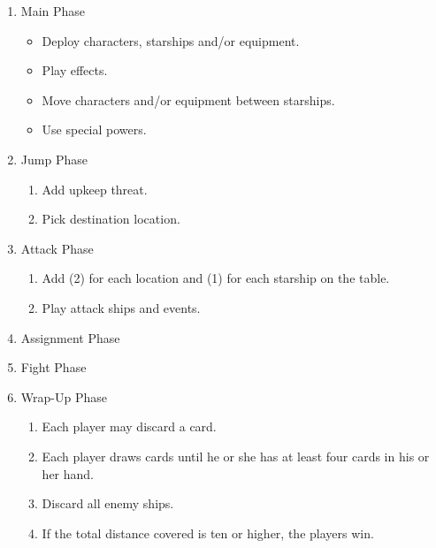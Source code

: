 \documentclass[11pt, a4paper]{article}
\begin{document}
\begin{enumerate}
 \item Main Phase

 \begin{itemize}
  \item Deploy characters, starships and/or equipment.
  \item Play effects.
  \item Move characters and/or equipment between starships.
  \item Use special powers.
 \end{itemize}

 \item Jump Phase

 \begin{enumerate}
  \item Add upkeep threat.
  \item Pick destination location.
 \end{enumerate}

 \item Attack Phase

 \begin{enumerate}
  \item Add (2) for each location and (1) for each starship on the table.
  \item Play attack ships and events.
 \end{enumerate}

 \item Assignment Phase
 \item Fight Phase
 \item Wrap-Up Phase

 \begin{enumerate}
  \item Each player may discard a card.
  \item Each player draws cards until he or she has at least four cards in his
or her hand.
  \item Discard all enemy ships.
  \item If the total distance covered is ten or higher, the players win.
 \end{enumerate}

\end{enumerate}
\end{document}
